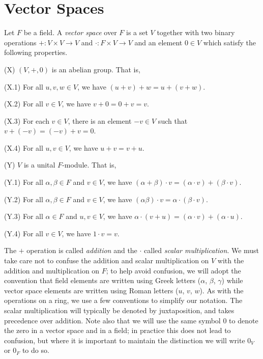 \section{Vector Spaces}

\begin{dfn}
\label{dfn:vec-spa}
Let $F$ be a field. A \emph{vector space} over $F$ is a set $V$ together with two binary operations $+ : V \times V \rightarrow V$ and $\cdot : F \times V \rightarrow V$ and an element $0 \in V$ which satisfy the following properties.
\begin{enumerate*}
\item[(X)] $(V,+,0)$ is an abelian group. That is,
\begin{enumerate*}
\item[(X.1)] For all $u,v,w \in V$, we have $(u+v)+w = u+(v+w)$. \label{dfn:vec-spa:add-assoc}
\item[(X.2)] For all $v \in V$, we have $v+0 = 0+v = v$. \label{dfn:vec-spa:add-ident}
\item[(X.3)] For each $v \in V$, there is an element $-v \in V$ such that $v + (-v) = (-v) + v = 0$.
\item[(X.4)] For all $u,v \in V$, we have $u+v = v+u$.
\end{enumerate*}
\item[(Y)] $V$ is a unital $F$-module. That is,
\begin{enumerate*}
\item[(Y.1)] For all $\alpha,\beta \in F$ and $v \in V$, we have $(\alpha+\beta) \cdot v = (\alpha \cdot v) + (\beta \cdot v)$.
\item[(Y.2)] For all $\alpha,\beta \in F$ and $v \in V$, we have $(\alpha\beta) \cdot v = \alpha \cdot (\beta \cdot v)$.
\item[(Y.3)] For all $\alpha \in F$ and $u,v \in V$, we have $\alpha \cdot (v + u) = (\alpha \cdot v) + (\alpha \cdot u)$.
\item[(Y.4)] For all $v \in V$, we have $1 \cdot v = v$.
\end{enumerate*}
\end{enumerate*}
\end{dfn}

The $+$ operation is called \emph{addition} and the $\cdot$ called \emph{scalar multiplication}. We must take care not to confuse the addition and scalar multiplication on $V$ with the addition and multiplication on $F$; to help avoid confusion, we will adopt the convention that field elements are written using Greek letters ($\alpha$, $\beta$, $\gamma$) while vector space elements are written using Roman letters ($u$, $v$, $w$). As with the operations on a ring, we use a few conventions to simplify our notation. The scalar multiplication will typically be denoted by juxtaposition, and takes precedence over addition. Note also that we will use the same symbol $0$ to denote the zero in a vector space and in a field; in practice this does not lead to confusion, but where it is important to maintain the distinction we will write $0_V$ or $0_F$ to do so.


